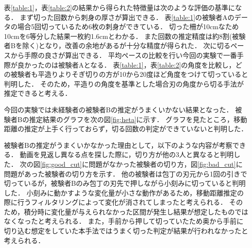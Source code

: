 \begin{table}[ht]
    \centering
    \caption{そぎ切りの特徴量}
    \label{table:2}
\end{table}
表\ref{table:1}，表\ref{table:2}の結果から得られた特徴量は次のような評価の基準になる．
まず切った回数から刺身の厚さが算出できる．
表\ref{table:1}の被験者Aのデータの場合5回切っているため6枚の刺身ができている．
切った柵が10cmなため10cmを6等分した結果一枚約1.6cmとわかる．
また回数の推定精度は約8割(被験者Bを除く)となり，改善の余地があるが十分な精度が得られた．
次に切るペースから手際の良さが算出できる．
平均ペースの比較を行い今回の実験で一番手際が良かったのは被験者Aとなる．
表\ref{table:1}，表\ref{table:2}の角度を比較し，どの被験者も平造りよりそぎ切りの方が10から20度ほど角度をつけて切っていると判明した．
そのため，平造りの角度を基準とした場合刃の角度から切る手法が推定できると考える．

今回の実験では未経験者の被験者Bの推定がうまくいかない結果となった．
被験者Bの推定結果のグラフを次の図\ref{fig:heta}に示す．
グラフを見たところ，移動距離の推定が上手く行っておらず，切る回数の判定ができていないと判明した．

被験者Bの推定がうまくいかなかった理由として，以下のような内容が考察できる．
動画を見返し異なる点を探した際に，切り方が他の3人と異なると判明した．
次の図\ref{fig:good_cut}に問題がなかった被験者の切り方，図\ref{fig:bad_cut}に問題があった被験者の切り方を示す．
他の被験者は包丁の刃元から1回の引きで切っているが，被験者Bのみ包丁の刃先で押しながら小刻みに切っていると判明した．
小刻みに動かすような変化量が小さな動作があるため，移動距離推定の際に行うフィルタリングによって変化が消されてしまったと考えられる．
そのため，積分時に変化量が与えられなかった区間が発生し結果が想定したものではなくなったと考えられる．
また，手前から押して切っていたため奥から手前に切り込む想定をしていた本手法ではうまく切った判定が結果が行われなかったと考えられる．

